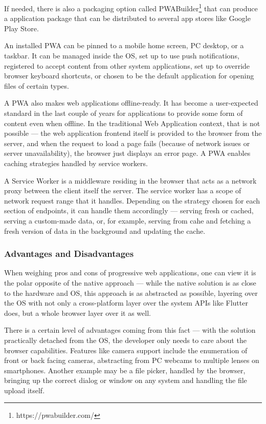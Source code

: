 \documentclass[
  digital,     %
  color,       %
  oneside,     %
  nosansbold,  %
  nocolorbold, %
  lof,         %
  lot,         %
]{fithesis4}
\begin{document}
If needed, there is also a packaging option called PWABuilder\footnote{https://pwabuilder.com/} that can produce a application package that can be distributed to several app stores like Google Play Store.

An installed PWA can be pinned to a mobile home screen, PC desktop, or a taskbar. It can be managed inside the OS, set up to use push notifications, registered to accept content from other system applications, set up to override browser keyboard shortcuts, or chosen to be the default application for opening files of certain types.

A PWA also makes web applications offline-ready. It has become a user-expected standard in the last couple of years for applications to provide some form of content even when offline. In the traditional Web Application context, that is not possible --- the web application frontend itself is provided to the browser from the server, and when the request to load a page fails (because of network issues or server unavailability), the browser just displays an error page. A PWA enables caching strategies handled by service workers.

A Service Worker is a middleware residing in the browser that acts as a network proxy between the client itself the server\cite{serviceWorkers}. The service worker has a scope of network request range that it handles. Depending on the strategy chosen for each section of endpoints, it can handle them accordingly --- serving fresh or cached, serving a custom-made data, or, for example, serving from cahe and fetching a fresh version of data in the background and updating the cache. 

\subsubsection{Advantages and Disadvantages}
When weighing pros and cons of progressive web applications, one can view it is the polar opposite of the native approach --- while the native solution is as close to the hardware and OS, this approach is as abstracted as possible, layering over the OS with not only a cross-platform layer over the system APIs like Flutter does, but a whole browser layer over it as well. 

There is a certain level of advantages coming from this fact --- with the solution practically detached from the OS, the developer only needs to care about the browser capabilities. Features like camera support include the enumeration of front or back facing cameras, abstracting from PC webcams to multiple lenses on smartphones. Another example may be a file picker, handled by the browser, bringing up the correct dialog or window on any system and handling the file upload itself.
\end{document}
